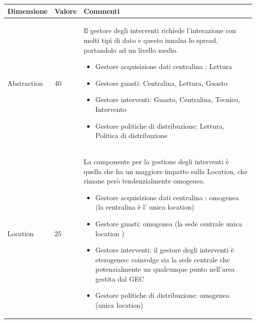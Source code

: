 \documentclass{beamer}
\begin{document}
\begin{frame}[allowframebreaks]
	
	
		\begin{center}
			\begin{table}
				\tiny
				\centering
				{\renewcommand{\arraystretch}{1.2}
					
					\begin{tabular}{|M{0.1\textwidth}|M{0.1\textwidth}|p{.6\textwidth}|}
						\hline
						Dimensione & Valore & Commenti \\
						\hline
						Abstraction & 40 & Il gestore degli interventi richiede l'interazione con molti tipi di dato e questo innalza lo spread, portandolo ad un livello medio.
						\begin{itemize}
							\item Gestore acquisizione dati centralina : Lettura
							\item Gestore guasti: Centralina, Lettura, Guasto
							\item Gestore interventi: Guasto, Centralina, Tecnico, Intervento
							\item Gestore politiche di distribuzione: Lettura, Politica di distribuzione
						\end{itemize} \\
						Location & 25 & La componente per la gestione degli interventi è quella che ha un maggiore impatto sulla Location, che rimane però tendenzialmente omogenea.
						\begin{itemize}
							\item Gestore acquisizione dati centralina : omogenea (la centralina è l' unica location)
							\item Gestore guasti:  omogenea (la sede centrale unica location )
							\item Gestore interventi: il gestore degli interventi è eterogeneo: coinvolge sia la sede centrale che potenzialmente un qualcunque punto nell'area gestita dal GEC
							\item Gestore politiche di distribuzione:  omogenea (unica location)
						\end{itemize} \\
						\hline
				\end{tabular}}
			\end{table}
		\end{center}	
	\end{frame}	
\end{document}
